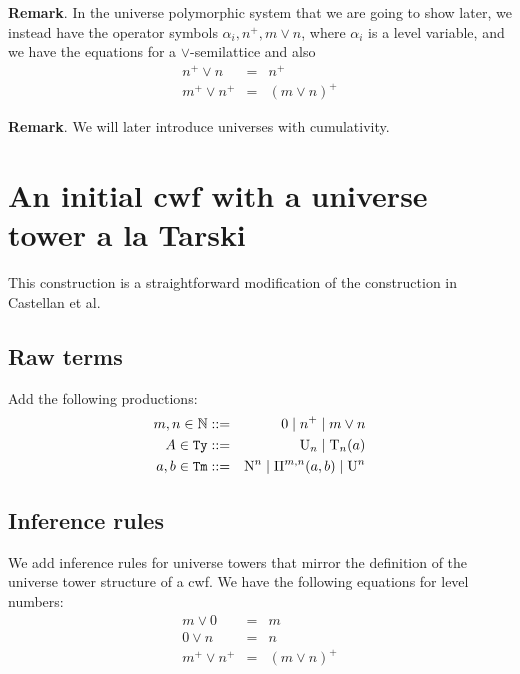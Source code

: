 \documentclass{lmcs}
\newcommand{\Ta}{\mathrm{T}}
\newcommand{\Tan}{\Ta_n}
\newcommand{\Un}{\U_n}
\newcommand{\Nhatn}{\N^n}
\begin{document}
{\bf Remark}. In the universe polymorphic system that we are going to show later, we instead have the operator symbols $\alpha_i, n^+, m \vee n$, where $\alpha_i$ is a level variable, and we have the equations for a $\vee$-semilattice and also 
\begin{eqnarray*}
n^+ \vee n &=& n^+\\
m^+ \vee n^+ &=& (m \vee n)^+
\end{eqnarray*}

{\bf Remark}. We will later introduce universes with cumulativity.

\section{An initial cwf with a universe tower a la Tarski}

This construction is a straightforward modification of the construction in Castellan et al. 

\subsection{Raw terms}

Add the following productions:
\begin{eqnarray*}
m, n \in \mathbb{N} &::=& 0 \mid n^+ \mid m \vee n\\
A \in \RawTy &::=& \Un \mid \Tan(a)\\
a,b \in \RawTm &::=&  \Nhatn \mid \Pi^{m,n}(a,b) \mid \U^n 
\end{eqnarray*}

\subsection{Inference rules}

We add inference rules for universe towers that mirror the definition of the universe tower structure of a cwf. We have the following equations for level numbers:
\begin{eqnarray*}
m \vee 0 &=&m\\
0 \vee n &=& n\\
m^+ \vee n^+ &=& (m \vee n)^+
\end{eqnarray*}
\end{document}
